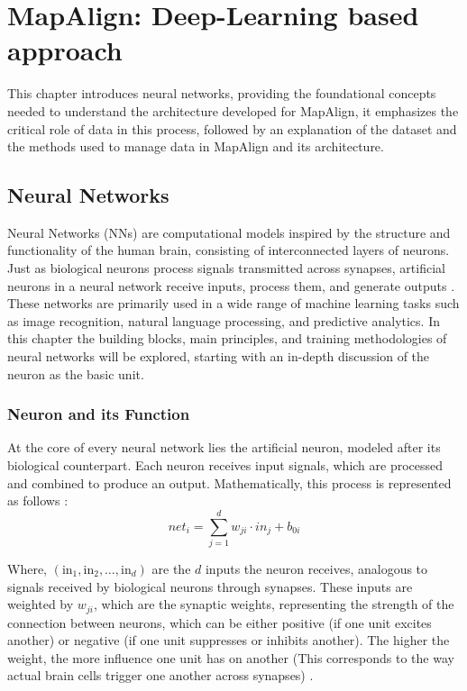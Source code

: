 \chapter{MapAlign: Deep-Learning based approach}

This chapter introduces neural networks, providing the foundational concepts needed to understand the architecture developed for MapAlign, it emphasizes the critical role of data in this process, followed by an explanation of the dataset and the methods used to manage data in MapAlign and its architecture. 

\section{Neural Networks}
Neural Networks (NNs) are computational models inspired by the structure and functionality of the human brain, consisting of interconnected layers of neurons. Just as biological neurons process signals transmitted across synapses, artificial neurons in a neural network receive inputs, process them, and generate outputs \cite{Grosan2011}. These networks are primarily used in a wide range of machine learning tasks such as image recognition, natural language processing, and predictive analytics.
In this chapter the building blocks, main principles, and training methodologies of neural networks will be explored, starting with an in-depth discussion of the neuron as the basic unit.

\subsection{Neuron and its Function}
At the core of every neural network lies the artificial neuron, modeled after its biological counterpart. Each neuron receives input signals, which are processed and combined to produce an output. Mathematically, this process is represented as follows \cite{10.11648/j.ajnna.20190501.12}:
\begin{equation}
    \textit{net}_i = \sum_{j=1}^{d} w_{ji} \cdot \textit{in}_j + b_{0i}
\end{equation}

Where, $(\text{in}_1, \text{in}_2, \ldots, \text{in}_d)$ are the $d$ inputs the neuron receives, analogous to signals received by biological neurons through synapses. These inputs are weighted by $w_{ji}$, which are the synaptic weights, representing the strength of the connection between neurons, which can be either positive (if one unit excites another) or negative (if one unit suppresses or inhibits another). The higher the weight, the more influence one unit has on another (This corresponds to the way actual brain cells trigger one another across synapses) \cite{10.11648/j.ajnna.20190501.12}.

